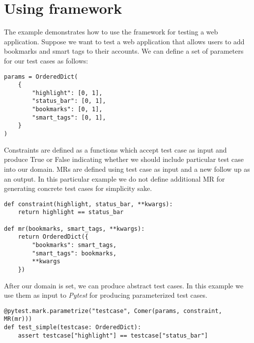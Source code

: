 \section{Using framework}

The example demonstrates how to use the framework for testing a web application. Suppose we want to test a web application that allows users to add bookmarks and smart tags to their accounts. We can define a set of parameters for our test cases as follows:

\begin{lstlisting}[label={lst:test-cases}]
params = OrderedDict(
	{
		"highlight": [0, 1],
		"status_bar": [0, 1],
		"bookmarks": [0, 1],
		"smart_tags": [0, 1],
	}
)
\end{lstlisting}

Constraints are defined as a functions which accept test case as input and produce True or False indicating whether we should include particular test case into our domain. MRs are defined using test case as input and a new follow up as an output. In this particular example we do not define additional MR for generating concrete test cases for simplicity sake.

\begin{lstlisting}[label={lst:test-cases}]
def constraint(highlight, status_bar, **kwargs):
	return highlight == status_bar

def mr(bookmarks, smart_tags, **kwargs):
	return OrderedDict({
		"bookmarks": smart_tags,
		"smart_tags": bookmarks,
		**kwargs
	})
\end{lstlisting}

After our domain is set, we can produce abstract test cases. In this example we use them as input to \textit{Pytest} for producing parameterized test cases. 

\begin{lstlisting}[label={lst:test-cases}]
@pytest.mark.parametrize("testcase", Comer(params, constraint, MR(mr)))
def test_simple(testcase: OrderedDict):
	assert testcase["highlight"] == testcase["status_bar"]
\end{lstlisting}


